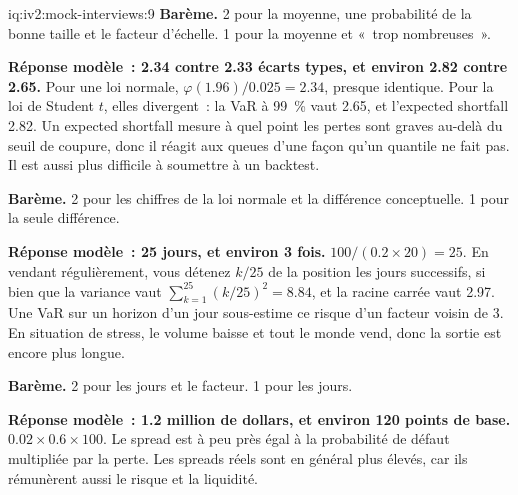 \begin{solution}{iq:iv2:mock-interviews:9}
\textbf{Barème.} 2 pour la moyenne, une probabilité de la bonne taille et le facteur d'échelle. 1 pour la moyenne et «~trop nombreuses~».

\ivstop
\textbf{Réponse modèle~: 2.34 contre 2.33 écarts types, et environ 2.82 contre 2.65.} Pour une loi normale, $\varphi(1.96)/0.025 = 2.34$, presque identique. Pour la loi de Student $t$, elles divergent~: la VaR à 99~\% vaut 2.65, et l'expected shortfall 2.82. Un expected shortfall mesure à quel point les pertes sont graves au-delà du seuil de coupure, donc il réagit aux queues d'une façon qu'un quantile ne fait pas. Il est aussi plus difficile à soumettre à un backtest.

\textbf{Barème.} 2 pour les chiffres de la loi normale et la différence conceptuelle. 1 pour la seule différence.

\ivstop
\textbf{Réponse modèle~: 25 jours, et environ 3 fois.} $100/(0.2 \times 20) = 25$. En vendant régulièrement, vous détenez $k/25$ de la position les jours successifs, si bien que la variance vaut $\sum_{k = 1}^{25}(k/25)^2 = 8.84$, et la racine carrée vaut 2.97. Une VaR sur un horizon d'un jour sous-estime ce risque d'un facteur voisin de 3. En situation de stress, le volume baisse et tout le monde vend, donc la sortie est encore plus longue.

\textbf{Barème.} 2 pour les jours et le facteur. 1 pour les jours.

\ivstop
\textbf{Réponse modèle~: 1.2 million de dollars, et environ 120 points de base.} $0.02 \times 0.6 \times 100$. Le spread est à peu près égal à la probabilité de défaut multipliée par la perte. Les spreads réels sont en général plus élevés, car ils rémunèrent aussi le risque et la liquidité.


\end{solution}

